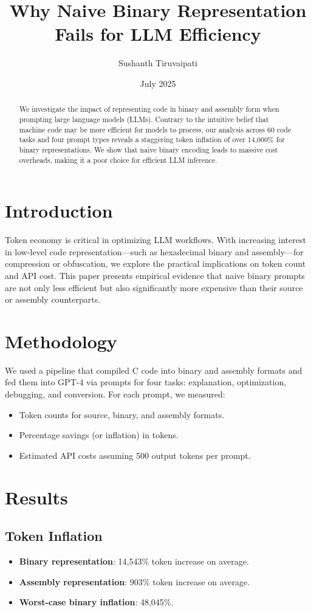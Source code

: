 \documentclass{article}
\title{Why Naive Binary Representation Fails for LLM Efficiency}
\author{Sushanth Tiruvaipati}
\date{July 2025}
\begin{document}
\maketitle

\begin{abstract}
We investigate the impact of representing code in binary and assembly form when prompting large language models (LLMs). Contrary to the intuitive belief that machine code may be more efficient for models to process, our analysis across 60 code tasks and four prompt types reveals a staggering token inflation of over 14,000\% for binary representations. We show that naive binary encoding leads to massive cost overheads, making it a poor choice for efficient LLM inference.
\end{abstract}

\section{Introduction}
Token economy is critical in optimizing LLM workflows. With increasing interest in low-level code representation—such as hexadecimal binary and assembly—for compression or obfuscation, we explore the practical implications on token count and API cost. This paper presents empirical evidence that naive binary prompts are not only less efficient but also significantly more expensive than their source or assembly counterparts.

\section{Methodology}
We used a pipeline that compiled C code into binary and assembly formats and fed them into GPT-4 via prompts for four tasks: explanation, optimization, debugging, and conversion. For each prompt, we measured:
\begin{itemize}
  \item Token counts for source, binary, and assembly formats.
  \item Percentage savings (or inflation) in tokens.
  \item Estimated API costs assuming 500 output tokens per prompt.
\end{itemize}

\section{Results}

\subsection{Token Inflation}
\begin{itemize}
  \item \textbf{Binary representation}: 14,543\% token increase on average.
  \item \textbf{Assembly representation}: 903\% token increase on average.
  \item \textbf{Worst-case binary inflation}: 48,045\%.
\end{itemize}
\end{document}
